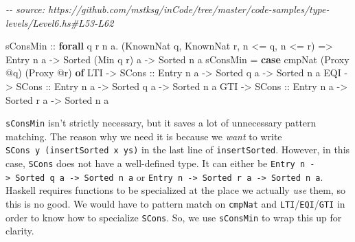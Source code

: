\documentclass[]{article}
\newenvironment{Shaded}{}{}
\newcommand{\CommentTok}[1]{\textcolor[rgb]{0.38,0.63,0.69}{\textit{#1}}}
\newcommand{\DataTypeTok}[1]{\textcolor[rgb]{0.56,0.13,0.00}{#1}}
\newcommand{\KeywordTok}[1]{\textcolor[rgb]{0.00,0.44,0.13}{\textbf{#1}}}
\newcommand{\NormalTok}[1]{#1}
\newcommand{\OperatorTok}[1]{\textcolor[rgb]{0.40,0.40,0.40}{#1}}
\newcommand{\OtherTok}[1]{\textcolor[rgb]{0.00,0.44,0.13}{#1}}
\begin{document}
\begin{Shaded}
\begin{Highlighting}[]
\CommentTok{{-}{-} source: https://github.com/mstksg/inCode/tree/master/code{-}samples/type{-}levels/Level6.hs\#L53{-}L62}

\OtherTok{sConsMin ::}
  \KeywordTok{forall}\NormalTok{ q r n a}\OperatorTok{.}
\NormalTok{  (}\DataTypeTok{KnownNat}\NormalTok{ q, }\DataTypeTok{KnownNat}\NormalTok{ r, n }\OperatorTok{\textless{}=}\NormalTok{ q, n }\OperatorTok{\textless{}=}\NormalTok{ r) }\OtherTok{=\textgreater{}}
  \DataTypeTok{Entry}\NormalTok{ n a }\OtherTok{{-}\textgreater{}}
  \DataTypeTok{Sorted}\NormalTok{ (}\DataTypeTok{Min}\NormalTok{ q r) a }\OtherTok{{-}\textgreater{}}
  \DataTypeTok{Sorted}\NormalTok{ n a}
\NormalTok{sConsMin }\OtherTok{=} \KeywordTok{case}\NormalTok{ cmpNat (}\DataTypeTok{Proxy} \OperatorTok{@}\NormalTok{q) (}\DataTypeTok{Proxy} \OperatorTok{@}\NormalTok{r) }\KeywordTok{of}
  \DataTypeTok{LTI} \OtherTok{{-}\textgreater{}} \DataTypeTok{SCons}\OtherTok{ ::} \DataTypeTok{Entry}\NormalTok{ n a }\OtherTok{{-}\textgreater{}} \DataTypeTok{Sorted}\NormalTok{ q a }\OtherTok{{-}\textgreater{}} \DataTypeTok{Sorted}\NormalTok{ n a}
  \DataTypeTok{EQI} \OtherTok{{-}\textgreater{}} \DataTypeTok{SCons}\OtherTok{ ::} \DataTypeTok{Entry}\NormalTok{ n a }\OtherTok{{-}\textgreater{}} \DataTypeTok{Sorted}\NormalTok{ q a }\OtherTok{{-}\textgreater{}} \DataTypeTok{Sorted}\NormalTok{ n a}
  \DataTypeTok{GTI} \OtherTok{{-}\textgreater{}} \DataTypeTok{SCons}\OtherTok{ ::} \DataTypeTok{Entry}\NormalTok{ n a }\OtherTok{{-}\textgreater{}} \DataTypeTok{Sorted}\NormalTok{ r a }\OtherTok{{-}\textgreater{}} \DataTypeTok{Sorted}\NormalTok{ n a}
\end{Highlighting}
\end{Shaded}

\texttt{sConsMin} isn't strictly necessary, but it saves a lot of unnecessary
pattern matching. The reason why we need it is because we \emph{want} to write
\texttt{SCons\ y\ (insertSorted\ x\ ys)} in the last line of
\texttt{insertSorted}. However, in this case, \texttt{SCons} does not have a
well-defined type. It can either be
\texttt{Entry\ n\ -\textgreater{}\ Sorted\ q\ a\ -\textgreater{}\ Sorted\ n\ a}
or
\texttt{Entry\ n\ -\textgreater{}\ Sorted\ r\ a\ -\textgreater{}\ Sorted\ n\ a}.
Haskell requires functions to be specialized at the place we actually \emph{use}
them, so this is no good. We would have to pattern match on \texttt{cmpNat} and
\texttt{LTI}/\texttt{EQI}/\texttt{GTI} in order to know how to specialize
\texttt{SCons}. So, we use \texttt{sConsMin} to wrap this up for clarity.
\end{document}
